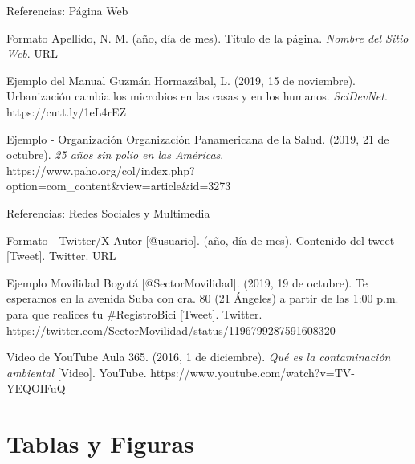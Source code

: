 \documentclass[spanish,aspectratio=169]{beamer}
\begin{document}
\begin{frame}{Referencias: Página Web}
	\begin{block}{Formato}
		\small
		Apellido, N. M. (año, día de mes). Título de la página. \textit{Nombre del Sitio Web}. URL
	\end{block}
	
	\begin{exampleblock}{Ejemplo del Manual}
		\footnotesize
		Guzmán Hormazábal, L. (2019, 15 de noviembre). Urbanización cambia los microbios en las casas y en los humanos. \textit{SciDevNet}. https://cutt.ly/1eL4rEZ
	\end{exampleblock}
	
	\begin{exampleblock}{Ejemplo - Organización}
		\footnotesize
		Organización Panamericana de la Salud. (2019, 21 de octubre). \textit{25 años sin polio en las Américas}. https://www.paho.org/col/index.php?option=com\_content\&view=article\&id=3273
	\end{exampleblock}
\end{frame}

\begin{frame}{Referencias: Redes Sociales y Multimedia}
	\begin{block}{Formato - Twitter/X}
		\small
		Autor [@usuario]. (año, día de mes). Contenido del tweet [Tweet]. Twitter. URL
	\end{block}
	
	\begin{exampleblock}{Ejemplo}
		\footnotesize
		Movilidad Bogotá [@SectorMovilidad]. (2019, 19 de octubre). Te esperamos en la avenida Suba con cra. 80 (21 Ángeles) a partir de las 1:00 p.m. para que realices tu \#RegistroBici [Tweet]. Twitter. https://twitter.com/SectorMovilidad/status/1196799287591608320
	\end{exampleblock}
	
	\begin{exampleblock}{Video de YouTube}
		\footnotesize
		Aula 365. (2016, 1 de diciembre). \textit{Qué es la contaminación ambiental} [Video]. YouTube. https://www.youtube.com/watch?v=TV-YEQOIFuQ
	\end{exampleblock}
\end{frame}

\section{Tablas y Figuras}
\end{document}
